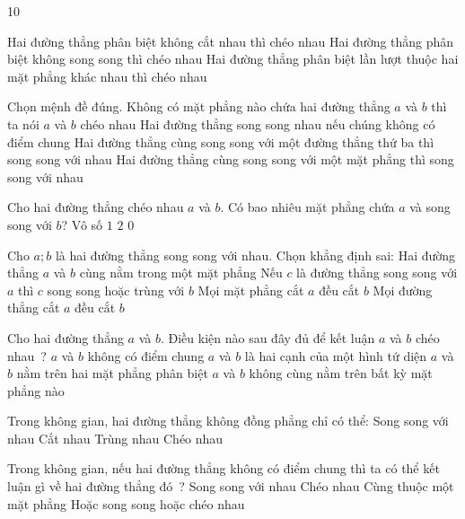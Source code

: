 \begin{indapan}{10}
\begin{ex}
	{Hai đường thẳng phân biệt không cắt nhau thì chéo nhau}
	{Hai đường thẳng phân biệt không song song thì chéo nhau}
	{Hai đường thẳng phân biệt lần lượt thuộc hai mặt phẳng khác nhau thì chéo nhau}
	\loigiai{
	}
\end{ex}
\begin{ex}%
	Chọn mệnh đề đúng.
	\choice
	{\True Không có mặt phẳng nào chứa hai đường thẳng $a$ và $b$ thì ta nói $a$ và $b$ chéo nhau}
	{Hai đường thẳng song song nhau nếu chúng không có điểm chung}
	{Hai đường thẳng cùng song song với một đường thẳng thứ ba thì song song với nhau}
	{Hai đường thẳng cùng song song với một mặt phẳng thì song song với nhau}
	\loigiai{
	}
\end{ex}
\begin{ex}%
	Cho hai đường thẳng chéo nhau $a$ và $b$. Có bao nhiêu mặt phẳng chứa $a$ và song song với $b$?
	\choice
	{Vô số}
	{\True $1$}
	{$2$}
	{$0$}
	\loigiai{
	}
\end{ex}
\begin{ex}%
	Cho $a;b$ là hai đường thẳng song song với nhau. Chọn khẳng định sai:
	\choice
	{Hai đường thẳng $a$ và $b$ cùng nằm trong một mặt phẳng}
	{Nếu $c$ là đường thẳng song song với $a$ thì $c$ song song hoặc trùng với $b$}
	{Mọi mặt phẳng cắt $a$ đều cắt $b$}
	{\True Mọi đường thẳng cắt $a$ đều cắt $b$}
	\loigiai{
	}
\end{ex}
\begin{ex}%
	Cho hai đường thẳng $a$ và $b$. Điều kiện nào sau đây đủ để kết luận $a$ và $b$ chéo nhau ?
	\choice
	{$a$ và $b$ không có điểm chung}
	{$a$ và $b$ là hai cạnh của một hình tứ diện}
	{$a$ và $b$ nằm trên hai mặt phẳng phân biệt}
	{\True $a$ và $b$ không cùng nằm trên bất kỳ mặt phẳng nào}
	\loigiai{
	}
\end{ex}
\begin{ex}%
	Trong không gian, hai đường thẳng không đồng phẳng chỉ có thể:
	\choice
	{Song song với nhau}
	{Cắt nhau}
	{Trùng nhau}
	{\True Chéo nhau}
	\loigiai{
	}
\end{ex}
\begin{ex}%
	Trong không gian, nếu hai đường thẳng không có điểm chung thì ta có thể kết luận gì về hai đường thẳng đó ?
	\choice
	{Song song với nhau}
	{Chéo nhau}
	{Cùng thuộc một mặt phẳng}
	{\True Hoặc song song hoặc chéo nhau}

\end{ex}
\end{indapan}
